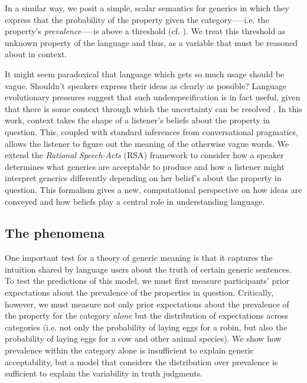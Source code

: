 \documentclass[10pt,letterpaper]{article}
\begin{document}
In a similar way, we posit a simple, scalar semantics for generics in which they express that the probability of the property given the category-----i.e. the property's \emph{prevalence}-----is above a threshold (cf. ). We treat this threshold as unknown property of the language and thus, as a variable that must be reasoned about in context. 

It might seem paradoxical that language which gets so much usage should be vague. 
Shouldn't speakers express their ideas as clearly as possible?
Language evolutionary pressures suggest that such underspecification is in fact useful, given that there is some context through which the uncertainty can be resolved \cite{Piantadosi2012}.
In this work, context takes the shape of a listener's beliefs about the property in question. This, coupled with 
standard inferences from conversational pragmatics, allows the listener to figure out the meaning of the otherwise vague words.
We extend the \emph{Rational Speech-Acts} (RSA) framework \cite{Frank2012,Goodman2013} to consider how a speaker determines what generics are acceptable to produce and how a listener might interpret generics differently depending on her belief's about the property in question. 
This formalism gives a new, computational perspective on how ideas are conveyed and how beliefs play a central role in understanding language.


%
\subsection{The phenomena}

One important test for a theory of generic meaning is that it captures the intuition shared by language users about the truth of certain generic sentences. To test the predictions of this model, we must first measure participants' prior expectations about the prevalence of the properties in question. Critically, however, we must measure not only prior expectations about the prevalence of the property for the category \emph{alone} but the distribution of expectations across categories (i.e. not only the probability of laying eggs for a robin, but also the probability of laying eggs for a cow and other animal species).  
We show how prevalence within the category alone is insufficient to explain generic acceptability, but a model that considers the distribution over prevalence is sufficient to explain the variability in truth judgments.
\end{document}

